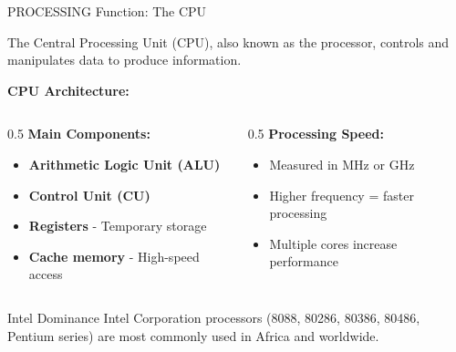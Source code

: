 \documentclass[aspectratio=169]{beamer}
\begin{document}
\begin{frame}{PROCESSING Function: The CPU}
    \begin{definition}
        The Central Processing Unit (CPU), also known as the processor, controls and manipulates data to produce information.
    \end{definition}
    
    \vspace{0.3cm}
    \textbf{CPU Architecture:}
    \begin{columns}
        \begin{column}{0.5\textwidth}
            \textbf{Main Components:}
            \begin{itemize}
                \item \textbf{Arithmetic Logic Unit (ALU)}
                \item \textbf{Control Unit (CU)}
                \item \textbf{Registers} - Temporary storage
                \item \textbf{Cache memory} - High-speed access
            \end{itemize}
            
           
        \end{column}
        \begin{column}{0.5\textwidth}
             \textbf{Processing Speed:}
            \begin{itemize}
                \item Measured in MHz or GHz
                \item Higher frequency = faster processing
                \item Multiple cores increase performance
            \end{itemize}
        \end{column}
    \end{columns}
    
    \begin{alertblock}{Intel Dominance}
        Intel Corporation processors (8088, 80286, 80386, 80486, Pentium series) are most commonly used in Africa and worldwide.
    \end{alertblock}
\end{frame}
\end{document}
